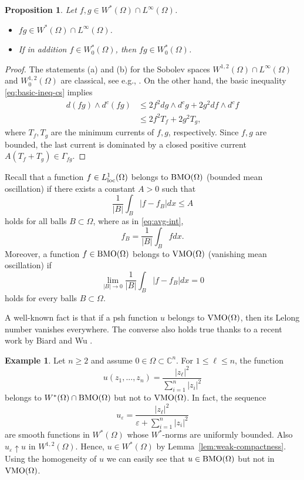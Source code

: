 \documentclass{amsart}
\newcommand{\veps}{\varepsilon}
\newcommand{\Ga}{\Gamma}
\newcommand{\Om}{\Omega}
\newcommand{\bC}{\mathbb{C}}
\newtheorem{prop}[thm]{Proposition}
\theoremstyle{definition}
\newtheorem{expl}[thm]{Example}
\numberwithin{thm}{section}
\numberwithin{equation}{section}
\renewcommand{\[}{\begin{equation}}
\renewcommand{\]}{\end{equation}}
\newcommand{\wed}{\wedge}
\begin{document}
\begin{prop} Let $f, g\in W^*(\Om) \cap L^\infty(\Om)$. 
\begin{itemize}
\item
[(a)] $fg\in W^*(\Om)\cap L^\infty(\Om)$.
\item
[(b)] If in addition $f\in W^*_0(\Om)$, then $fg\in W^*_0(\Om)$.
\end{itemize}
\end{prop}

\begin{proof} The statements (a) and (b) for the Sobolev spaces $W^{1,2}(\Om) \cap L^\infty(\Om)$ and $W^{1,2}_0(\Om)$ are classical, see e.g., \cite[Proposition~9.4, ~9.18]{Bz11}. On the other hand, the basic inequality \eqref{eq:basic-ineq-cs} implies
$$\begin{aligned}
d(fg)\wed d^c (fg) &\leq 2 f^2 dg\wed d^c g + 2g^2 df \wed d^c f \\
&\leq 2 f^2 T_f + 2 g^2 T_g,
\end{aligned}$$
where $T_f, T_g$ are the minimum currents of $f,g$, respectively. 
Since $f,g$ are bounded, the last current is dominated by a closed positive current $A (T_f + T_g) \in \Ga_{fg}$.
\end{proof}

Recall that a function $f\in L^1_{\rm loc}(\Om)$  belongs to ${\rm BMO}(\Om)$ (bounded mean oscillation) if there exists a constant $A>0$ such that
\[\label{eq:bmo}
	 \frac{1}{|B|} \int_{B} |f - f_B | dx \leq A
\]
holds for all balls $B\subset \Om$, where as in \eqref{eq:avg-int}, 
$$f_B =  \frac{1}{|B|}\int_B f dx.$$
Moreover, a function $f\in {\rm BMO}(\Om)$ belongs to ${\rm VMO}(\Om)$ (vanishing mean oscillation) if 
\[ \label{eq:vmo}
	\lim_{|B| \to 0} \frac{1}{|B|} \int_B |f - f_B | dx  =0
\]
holds for every balls $B\subset \Om$.

A well-known fact is that if a psh function $u$ belongs to ${\rm VMO}(\Om)$, then its Lelong number vanishes everywhere. The converse also holds true thanks to a recent work by Biard and Wu \cite{BW24}.


\begin{expl}\label{expl:VMO} Let $n\geq 2$ and assume $0\in \Om\subset \bC^n$. For $1\leq \ell \leq n$, the function 
$$u(z_1,...,z_n) = \frac{|z_\ell|^2}{\sum_{i =1}^n |z_i|^2}$$
belongs to $W^*(\Om) \cap {\rm BMO}(\Om)$ but not to ${\rm VMO}(\Om)$.
In fact, the sequence 
$$ u_\veps = \frac{|z_\ell|^2}{\veps+ \sum_{i =1}^n |z_i|^2}
$$
are smooth functions in $W^*(\Om)$ whose $W^*$-norms are uniformly bounded. Also $u_\veps \uparrow u$ in $W^{1,2}(\Om)$. Hence, $u\in W^*(\Om)$ by Lemma~\ref{lem:weak-compactness}. Using the homogeneity of $u$ we can easily see that $u\in {\rm BMO}(\Om)$ but not in ${\rm VMO}(\Om)$.
\end{expl}
\end{document}
